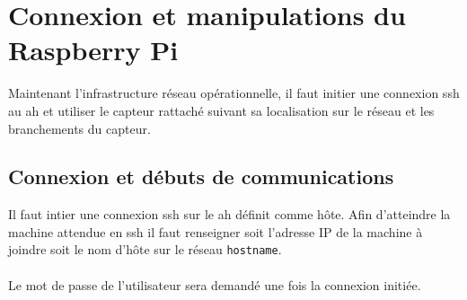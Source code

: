 \documentclass[a4paper]{article}
\begin{document}
\section{Connexion et manipulations du Raspberry Pi}
Maintenant l'infrastructure réseau opérationnelle, il faut initier une connexion \gls{ssh} au \acrshort{ah} et utiliser le capteur rattaché suivant sa localisation sur le réseau et les branchements du capteur.
\subsection{Connexion et débuts de communications}
Il faut intier une connexion \gls{ssh} sur le \acrshort{ah} définit comme hôte. Afin d'atteindre la machine attendue en \gls{ssh} il faut renseigner soit l'adresse IP de la machine à joindre soit le nom d'hôte sur le réseau \verb|hostname|.\\\\Le mot de passe de l'utilisateur sera demandé une fois la connexion initiée.
\end{document}
